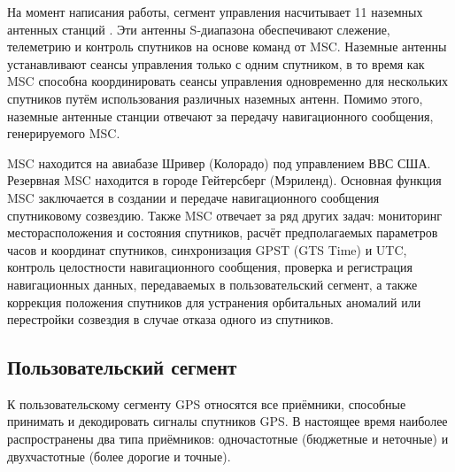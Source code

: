 На момент написания работы, сегмент управления насчитывает 11 наземных антенных станций \cite{GPS}.
Эти антенны S-диапазона обеспечивают слежение, телеметрию и контроль спутников на основе команд от MSC. 
Наземные антенны устанавливают сеансы управления только с одним спутником, в то время как MSC способна координировать сеансы управления одновременно для нескольких спутников путём использования различных наземных антенн.
Помимо этого, наземные антенные станции отвечают за передачу навигационного сообщения, генерируемого MSC.

MSC находится на авиабазе Шривер (Колорадо) под управлением ВВС США. 
Резервная MSC находится в городе Гейтерсберг (Мэриленд).
Основная функция MSC заключается в создании и передаче навигационного сообщения спутниковому созвездию.
Также MSC отвечает за ряд других задач: мониторинг месторасположения и состояния спутников, расчёт предполагаемых параметров часов и координат спутников, синхронизация GPST (GTS Time) и UTC, контроль целостности навигационного сообщения, проверка и регистрация навигационных данных, передаваемых в пользовательский сегмент, а также коррекция положения спутников для устранения орбитальных аномалий или перестройки созвездия в случае отказа одного из спутников. 

\subsection*{\textbf{Пользовательский сегмент}}

К пользовательскому сегменту GPS относятся все приёмники, способные принимать и декодировать сигналы спутников GPS.
В настоящее время наиболее распространены два типа приёмников: одночастотные (бюджетные и неточные) и двухчастотные (более дорогие и точные).